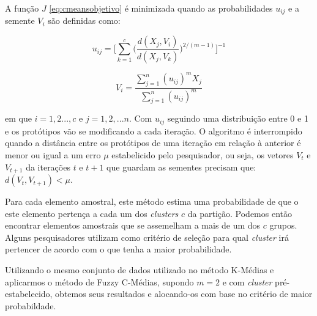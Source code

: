 \documentclass[
]{book}
\begin{document}
A função \(J\) \eqref{eq:cmeansobjetivo} é minimizada quando as probabilidades \(u_{ij}\) e a semente \(V_i\) são definidas como:

\begin{equation}
u_{ij}=\Big[\displaystyle \sum^c_{k=1}\Big(\frac{d(X_j,V_i)}{d(X_j,V_k)}\Big)^{2/(m-1)}\Big]^{-1}
 \label{eq:cmeansprob}
\end{equation}

\begin{equation}
V_{i}=\displaystyle \frac{\sum^n_{j=1}(u_{ij})^m X_j}{\sum^n_{j=1}(u_{ij})^m} 
\label{eq:cmeanssemente}
\end{equation}

em que \(i=1,2...,c\) e \(j=1,2,...n\). Com \(u_{ij}\) seguindo uma distribuição entre 0 e 1 e os protótipos vão se modificando a cada iteração. O algoritmo é interrompido quando a distância entre os protótipos de uma iteração em relação à anterior é menor ou igual a um erro \(\mu\) estabelicido pelo pesquisador, ou seja, os vetores \(V_t\) e \(V_{t+1}\) da iterações \(t\) e \(t+1\) que guardam as sementes precisam que: \(d(V_t,V_{t+1})<\mu\).

Para cada elemento amostral, este método estima uma probabilidade de que o este elemento pertença a cada um dos \emph{clusters} \(c\) da partição. Podemos então encontrar elementos amostrais que se assemelham a mais de um dos \(c\) grupos. Alguns pesquisadores utilizam como critério de seleção para qual \emph{cluster} irá pertencer de acordo com o que tenha a maior probabilidade.

Utilizando o mesmo conjunto de dados utilizado no método K-Médias e aplicarmos o método de Fuzzy C-Médias, supondo \(m=2\) e com \emph{cluster} pré-estabelecido, obtemos seus resultados e alocando-os com base no critério de maior probabildade.
\end{document}
